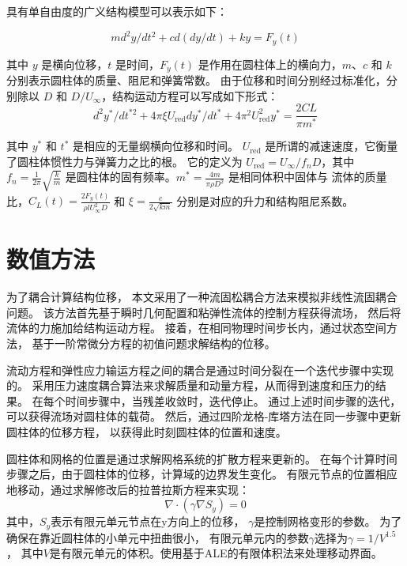 \documentclass[UTF8,zihao=5]{ctexart} %
\begin{document}
具有单自由度的广义结构模型可以表示如下：

\begin{equation}
    md^2y/dt^2 + cd(dy/dt) + ky = F_y(t)
\end{equation}

其中 \(y\) 是横向位移，\(t\) 是时间，\(F_y(t)\) 是作用在圆柱体上的横向力，\(m\)、\(c\) 和 \(k\) 分别表示圆柱体的质量、阻尼和弹簧常数。
由于位移和时间分别经过标准化，分别除以 \(D\) 和 \(D/U_\infty\)，结构运动方程可以写成如下形式：
\begin{equation}
    d^2y^*/dt^{*2} + 4\pi\xi U_{\text{red}} dy^*/dt^* + 4\pi^2U_{\text{red}}^2y^* = \frac{2CL}{\pi m^*}
\end{equation}

其中 \(y^*\) 和 \(t^*\) 是相应的无量纲横向位移和时间。
\(U_{\text{red}}\) 是所谓的减速速度，它衡量了圆柱体惯性力与弹簧力之比的根。
它的定义为 \(U_{\text{red}} = U_\infty/f_nD\)，其中 \(f_n = \frac{1}{2\pi}\sqrt{\frac{k}{m}}\)
是圆柱体的固有频率。\(m^* = \frac{4m}{\pi\rho D^2}\) 是相同体积中固体与
流体的质量比，\(C_L(t) = \frac{2F_y(t)}{\rho lU_\infty^2D}\) 和
\(\xi = \frac{c}{2\sqrt{km}}\)
分别是对应的升力和结构阻尼系数。

\section{数值方法}

为了耦合计算结构位移，
本文采用了一种流固松耦合方法来模拟非线性流固耦合问题。
该方法首先基于瞬时几何配置和粘弹性流体的控制方程获得流场，
然后将流体的力施加给结构运动方程。
接着，在相同物理时间步长内，通过状态空间方法，
基于一阶常微分方程的初值问题求解结构的位移。

流动方程和弹性应力输运方程之间的耦合是通过时间分裂在一个迭代步骤中实现的。
采用压力速度耦合算法来求解质量和动量方程，从而得到速度和压力的结果。
在每个时间步骤中，当残差收敛时，迭代停止。
通过上述时间步骤的迭代，可以获得流场对圆柱体的载荷。
然后，通过四阶龙格-库塔方法在同一步骤中更新圆柱体的位移方程，
以获得此时刻圆柱体的位置和速度。

圆柱体和网格的位置是通过求解网格系统的扩散方程来更新的。
在每个计算时间步骤之后，由于圆柱体的位移，计算域的边界发生变化。
有限元节点的位置相应地移动，通过求解修改后的拉普拉斯方程来实现：
\begin{equation}
    \nabla \cdot (\gamma \nabla S_y) = 0
\end{equation}
其中，$S_y$表示有限元单元节点在y方向上的位移，
$\gamma$是控制网格变形的参数。
为了确保在靠近圆柱体的小单元中扭曲很小，
有限元单元内的参数$\gamma$选择为$\gamma = 1/V^{1.5}$，
其中$V$是有限元单元的体积。使用基于ALE的有限体积法来处理移动界面。
\end{document}
